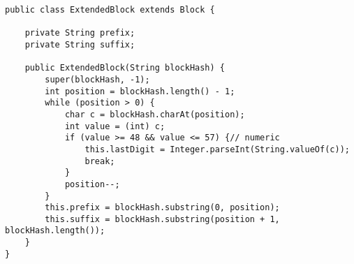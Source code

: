 \begin{lstlisting}
public class ExtendedBlock extends Block {

    private String prefix;
    private String suffix;

    public ExtendedBlock(String blockHash) {
        super(blockHash, -1);
        int position = blockHash.length() - 1;
        while (position > 0) {
            char c = blockHash.charAt(position);
            int value = (int) c;
            if (value >= 48 && value <= 57) {// numeric
                this.lastDigit = Integer.parseInt(String.valueOf(c));
                break;
            }
            position--;
        }
        this.prefix = blockHash.substring(0, position);
        this.suffix = blockHash.substring(position + 1, blockHash.length());
    }
}
\end{lstlisting}

